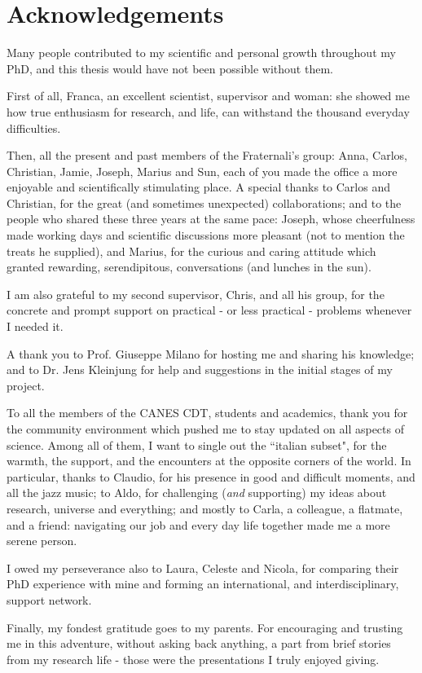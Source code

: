 \chapter*{Acknowledgements}
%
\begin{onehalfspacing}
Many people contributed to my scientific and personal growth throughout my PhD, and this thesis would have not been possible without them.

First of all, Franca, an excellent scientist, supervisor and woman: she showed me how true enthusiasm for research, and life, can withstand the thousand everyday difficulties.

Then, all the present and past members of the Fraternali's group: Anna, Carlos, Christian, Jamie, Joseph, Marius and Sun, each of you made the office a more enjoyable and scientifically stimulating place. A special thanks to Carlos and Christian, for the great (and sometimes unexpected) collaborations; and to the people who shared these three years at the same pace: Joseph, whose cheerfulness made working days and scientific discussions more pleasant (not to mention the treats he supplied), and Marius, for the curious and caring attitude which granted rewarding, serendipitous, conversations (and lunches in the sun).

I am also grateful to my second supervisor, Chris, and all his group, for the concrete and prompt support on practical - or less practical - problems whenever I needed it.

A thank you to Prof. Giuseppe Milano for hosting me and sharing his knowledge; and to Dr. Jens Kleinjung for help and suggestions in the initial stages of my project.

To all the members of the CANES CDT, students and academics, thank you for the community environment which pushed me to stay updated on all aspects of science. Among all of them, I want to single out the ``italian subset", for the warmth, the support, and the encounters at the opposite corners of the world. In particular, thanks to Claudio, for his presence in good and difficult moments, and all the jazz music; to Aldo, for challenging (\emph{and} supporting) my ideas about research, universe and everything; and mostly to Carla, a colleague, a flatmate, and a friend: navigating our job and every day life together made me a more serene person.

I owed my perseverance also to Laura, Celeste and Nicola, for comparing their PhD experience with mine and forming an international, and interdisciplinary, support network.

Finally, my fondest gratitude goes to my parents. For encouraging and trusting me in this adventure, without asking back anything, a part from brief stories from my research life - those were the presentations I truly enjoyed giving.

\end{onehalfspacing}



